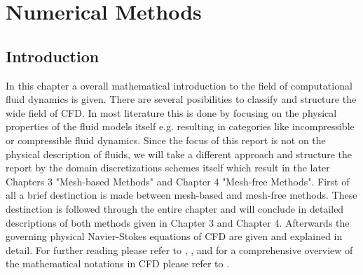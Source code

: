 
\chapter{Numerical Methods} %

\label{Chapter3} %



\section{Introduction}

In this chapter a overall mathematical introduction to the field of computational fluid dynamics is given. There are several
posibilities to classify and structure the wide field of CFD. In most literature this is done by focusing on the physical properties
of the fluid models itself e.g. \citep{Date2005} resulting in categories like incompressible or compressible fluid dynamics. Since the focus of this
report is not on the physical description of fluids, we will take a different approach and structure the report by the domain discretizations
schemes itself which result in the later Chapters 3 "Mesh-based Methods" and Chapter 4 "Mesh-free Methods". First of all a
brief destinction is made between mesh-based and mesh-free methods. These destinction is followed through the entire chapter
and will conclude in detailed descriptions of both methods given in Chapter 3 and Chapter 4. Afterwards the governing physical Navier-Stokes
equations of CFD are given and explained in detail.
For further reading please refer to \citep{Date2005}, \citep{Cebeci2005}, \citep{Toro2009} and for a comprehensive overview of the mathematical notations in CFD please refer to \citep{Aris1989}.

